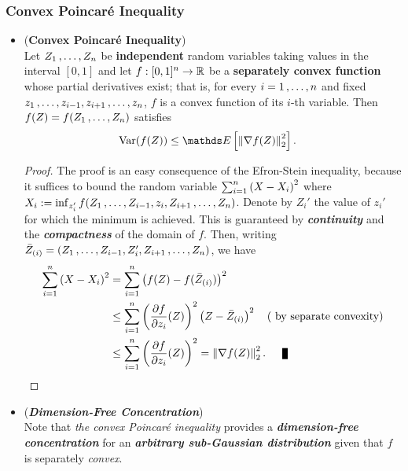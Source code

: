 \documentclass[11pt]{article}
\begin{document}
\subsubsection{Convex Poincar{\'e} Inequality}
\begin{itemize}
\item \begin{theorem} (\textbf{Convex Poincar{\'e} Inequality}) \citep{boucheron2013concentration} \\
Let $Z_1 \,{,}\ldots{,}\, Z_n$ be \textbf{independent} random variables taking values in the interval $[0, 1]$ and let $f : [0, 1]^n \to {\mathbb R}$ be a \textbf{separately convex function} whose partial derivatives exist; that is, for every $i = 1 \,{,}\ldots{,}\, n$ and fixed $z_1 \,{,}\ldots{,}\, z_{i-1}, z_{i+1} \,{,}\ldots{,}\, z_n$,  $f$ is a convex function of its $i$-th variable. Then $f(Z) = f(Z_1 \,{,}\ldots{,}\, Z_n)$ satisfies
\begin{align}
\text{Var}(f(Z)) &\le \E{}{\norm{\nabla f(Z)}{2}^2}. \label{ineqn: convex_poincare_inequality}
\end{align}
\end{theorem}
\begin{proof}
The proof is an easy consequence of the Efron-Stein inequality, because it suffices to bound the random variable $\sum_{i=1}^{n}\left(X - X_i\right)^2$ where
$X_i := \inf_{z_i'}f(Z_1 \,{,}\ldots{,}\, Z_{i-1}, z_i, Z_{i+1} \,{,}\ldots{,}\, Z_n)$. Denote by $Z_i'$ the value of $z_i'$ for which the minimum is achieved. This is guaranteed by \emph{\textbf{continuity}} and the \emph{\textbf{compactness}} of the domain of $f$.
Then, writing $\bar{Z}_{(i)} = (Z_1 \,{,}\ldots{,}\, Z_{i-1}, Z_i', Z_{i+1} \,{,}\ldots{,}\, Z_n)$, we have
\begin{align*}
\sum_{i=1}^{n}\paren{X - X_i}^2 &= \sum_{i=1}^{n}\paren{f(Z) - f(\bar{Z}_{(i)} )}^2\\
&\le \sum_{i=1}^{n}\paren{\partdiff{f}{z_i}(Z)}^2\paren{Z - \bar{Z}_{(i)}}^2 \quad (\text{ by separate convexity})\\
&\le  \sum_{i=1}^{n}\paren{\partdiff{f}{z_i}(Z)}^2 = \norm{\nabla f(Z)}{2}^2. \qed
\end{align*}
\end{proof}

\item \begin{remark} (\textbf{\emph{Dimension-Free Concentration}})\\
Note that \emph{the convex Poincar{\'e} inequality} provides a \emph{\textbf{dimension-free concentration}} for an \emph{\textbf{arbitrary sub-Gaussian distribution}} given that $f$ is separately \emph{convex}.
\end{remark}
\end{itemize}
\end{document}
